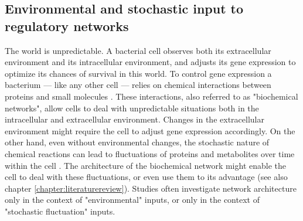 \subsection*{Environmental and stochastic input to regulatory networks}

The world is unpredictable.
%
A bacterial cell observes both its extracellular environment and its intracellular environment,
and adjusts its gene expression to 
optimize its chances of survival in this world.
%
To control gene expression a bacterium --- like any other cell --- relies on chemical interactions between proteins and small molecules \cite{Bray1995, Alon2006, Alon2007, Tyson2010}.
These interactions, also referred to as "biochemical networks", 
%
allow cells to deal with 
unpredictable situations
both in the intracellular and extracellular environment.
%
Changes in the extracellular environment might require the cell to adjust gene expression accordingly.
%
On the other hand,  even without environmental changes, the stochastic nature of chemical reactions can lead to fluctuations of proteins and metabolites over time within the cell \cite{Elowitz2002,Kiviet2014}.
The architecture of the biochemical network might enable the cell to deal with these fluctuations, or even use them to its advantage (see also chapter \ref{chapter:literaturereview}).
%
Studies often investigate network architecture only in the context of "environmental" inputs, or only in the context of "stochastic fluctuation" inputs.
